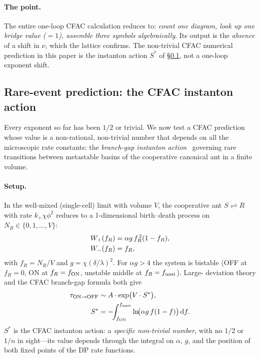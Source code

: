 \documentclass[10pt,a4paper,twocolumn]{article}
\newcommand{\dd}{\mathrm{d}}
\theoremstyle{definition}
\begin{document}
\paragraph{The point.}
The entire one-loop CFAC calculation reduces to: \emph{count one
diagram, look up one bridge value ($=1$), assemble three symbols
algebraically}.  Its output is the \emph{absence} of a shift in
$\nu$, which the lattice confirms.  The non-trivial CFAC
numerical prediction in this paper is the instanton action $S^*$
of \S\ref{sec:ant-instanton}, not a one-loop exponent shift.

\subsection{Rare-event prediction: the CFAC instanton action}
\label{sec:ant-instanton}

Every exponent so far has been $1/2$ or trivial.  We now test a
CFAC prediction whose value is a non-rational, non-trivial
number that depends on all the microscopic rate constants:
the \emph{branch-gap instanton action}~\citep{Amarteifio2026cfac}
governing rare transitions between metastable basins of the
cooperative canonical ant in a finite volume.

\paragraph{Setup.}
In the well-mixed (single-cell) limit with volume $V$, the
cooperative ant $S\rightleftharpoons R$ with rate
$k_+\chi\phi^2$ reduces to a 1-dimensional birth--death process
on $N_R\in\{0,1,\ldots,V\}$:
\begin{align}
  W_+(f_R) &= \alpha g\,f_R^{\,2}(1-f_R), \notag\\
  W_-(f_R) &= f_R,
\end{align}
with $f_R = N_R/V$ and $g = \chi(\delta/\lambda)^2$.
For $\alpha g > 4$ the system is bistable (OFF at $f_R=0$, ON at
$f_R=f_{\rm ON}$, unstable middle at $f_R=f_{\rm unst}$).  Large-
deviation theory and the CFAC branch-gap formula both give
\begin{align}\label{eq:instanton-action}
  \tau_{\rm ON\to OFF} &\sim A \cdot \exp\bigl(V\cdot S^*\bigr),\\
  S^* &= -\!\!\int_{f_{\rm ON}}^{f_{\rm unst}}
    \ln\!\bigl(\alpha g\,f(1-f)\bigr)\,\dd f. \notag
\end{align}
$S^*$ is the CFAC instanton action: a \emph{specific non-trivial
number}, with no $1/2$ or $1/n$ in sight---its value depends
through the integral on $\alpha$, $g$, and the position of both
fixed points of the DP rate functions.
\end{document}

